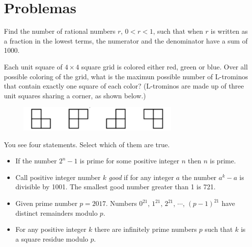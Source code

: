 \section{Problemas}

\begin{section-problem}
    Find the number of rational numbers $r$, $0 < r < 1$, such that when $r$ is written as a fraction in the lowest terms, the numerator and the denominator have a sum of 1000.
\end{section-problem}

\begin{section-problem}
    Each unit square of $4 \times 4$ square grid is colored either red, green or blue.
    Over all possible coloring of the grid, what is the maximun possible number of L-trominos that contain exactly one square of each color? (L-trominos are made up of three unit squares sharing a corner, as shown below.)
    \begin{figure}[htb]
        \centering
        \includegraphics[width=8cm]{images/problem 2}
    \end{figure}
\end{section-problem}

\begin{section-problem}
    You see four statements.
    Select which of them are true.
    \begin{itemize}
        \item If the number $2^n - 1$ is prime for some positive integer $n$ then $n$ is prime.
        \item Call positive integer number $k$ \textit{good} if for any integer $a$ the number $a^k - a$ is divisible by 1001.
        The smallest good number greater than 1 is 721.
        \item Given prime number $p = 2017$.
        Numbers $0^{21}$, $1^{21}$, $2^{21}$, $\cdots$, $(p - 1)^{21}$ have distinct remainders modulo $p$.
        \item For any positive integer $k$ there are infinitely prime numbers $p$ such that $k$ is a square residue modulo $p$.
    \end{itemize}
\end{section-problem}

